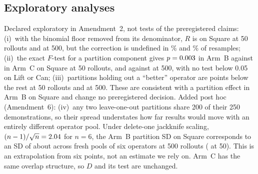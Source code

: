 \IfFileExists{IEEEtran.cls}{\documentclass[journal]{IEEEtran}}{\documentclass[10pt,twocolumn]{article}}
\begin{document}
\begin{table}[t]
\centering
\caption{Seed effect and resolvability from Arm~A ($n$ states, ten seeds). Floors as in Section~\ref{sec:stats}; Cochran's $p$ tests for any difference between seeds on shared states. Paired and unpaired: smallest difference between two three-seed means distinguishable at 95\% (Eq.~\ref{eq:mdd}) on shared or independent states, $t$ quantile in parentheses; a true difference of that size is detected about half the time. Last column: paired true difference detected with 80\% power (normal quantiles). $^{*}$Seed SD below the per-state floor; the floor is used. All but the seed SD are post hoc (Amendments~4--6).}
\label{tab:resolve}
\setlength{\tabcolsep}{4pt}
\resizebox{\columnwidth}{!}{}
\end{table}

\subsection{Exploratory analyses}
\label{sec:explore}
Declared exploratory in Amendment~2, not tests of the preregistered claims: (i)~with the binomial floor removed from its denominator, $R$ is \OneSqRCorr{} on Square at 50 rollouts and \TwoSqRCorr{} at 500, but the correction is undefined in \OneSqRCorrFloorFrac\% and \TwoSqRCorrFloorFrac\% of resamples; (ii)~the exact $F$-test for a partition component gives $p=0.003$ in Arm~B against \OneSqCFp{} in Arm~C on Square at 50 rollouts, and \TwoSqBFp{} against \TwoSqCFp{} at 500, with no test below 0.05 on Lift or Can; (iii)~partitions holding out a ``better'' operator are \OneSqDropDiff{} points below the rest at 50 rollouts and \TwoSqDropDiff{} at 500. These are consistent with a partition effect in Arm~B on Square and change no preregistered decision. Added post hoc (Amendment~6): (iv)~any two leave-one-out partitions share 200 of their 250 demonstrations, so their spread understates how far results would move with an entirely different operator pool. Under delete-one jackknife scaling, $(n-1)/\sqrt{n}=2.04$ for $n=6$, the Arm~B partition SD on Square corresponds to an SD of about \TwoSqJackSDp{} across fresh pools of six operators at 500 rollouts (\OneSqJackSDp{} at 50). This is an extrapolation from six points, not an estimate we rely on. Arm~C has the same overlap structure, so $D$ and its test are unchanged.
\end{document}
